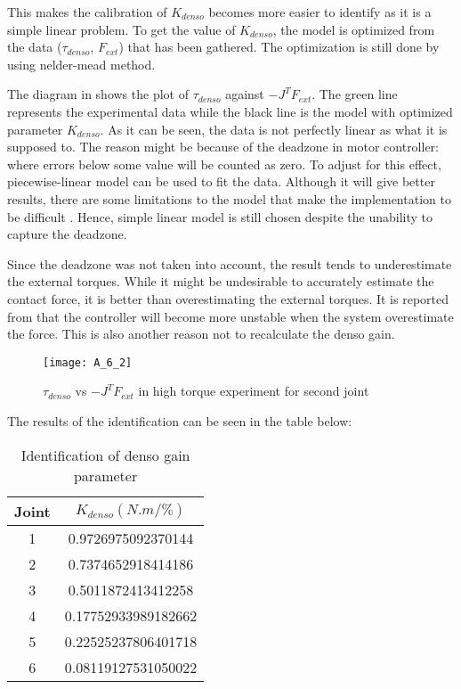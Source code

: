 This makes the calibration of $K_{denso}$ becomes more easier to identify as it is a simple linear problem. To get the value of $K_{denso}$, the model is optimized from the data ($\tau_{denso}$, $F_{ext}$) that has been gathered. The optimization is still done by using nelder-mead method. 

The diagram in  shows the plot of $\tau_{denso}$ against $- J^{T} F_{ext}$. The green line represents the experimental data while the black line is the model with optimized parameter $K_{denso}$. As it can be seen, the data is not perfectly linear as what it is supposed to. The reason might be because of the deadzone in motor controller: where errors below some value will be counted as zero. To adjust for this effect, piecewise-linear model can be used to fit the data. Although it will give better results, there are some limitations to the model that make the implementation to be difficult \cite{Nori15}. Hence, simple linear model is still chosen despite the unability to capture the deadzone. 

Since the deadzone was not taken into account, the result tends to underestimate the external torques. While it might be undesirable to accurately estimate the contact force, it is better than overestimating the external torques. It is reported from \cite{Nori15} that the controller will become more unstable when the system overestimate the force. This is also another reason not to recalculate the denso gain. 

\begin{figure}[H]
    \centering
    \texttt{[image: A\_6\_2]}
    \caption{$\tau_{denso}$ vs $- J^{T} F_{ext}$ in high torque experiment for second joint}
    \label{fig: tor calibration}
\end{figure}

The results of the identification can be seen in the table below:
\begin{table}[H]
    \centering
    \begin{tabular}{| c | c |}
    \hline
    Joint & $K_{denso} (N.m/\%) $             \\ \hline
    1     & 0.9726975092370144      \\ \hline
    2     & 0.7374652918414186      \\ \hline
    3     & 0.5011872413412258      \\ \hline
    4     & 0.17752933989182662     \\ \hline
    5     & 0.22525237806401718     \\ \hline
    6     & 0.08119127531050022     \\ \hline
    \end{tabular}
    \caption{Identification of denso gain parameter}
    \label{table:denso_gain}
\end{table}

